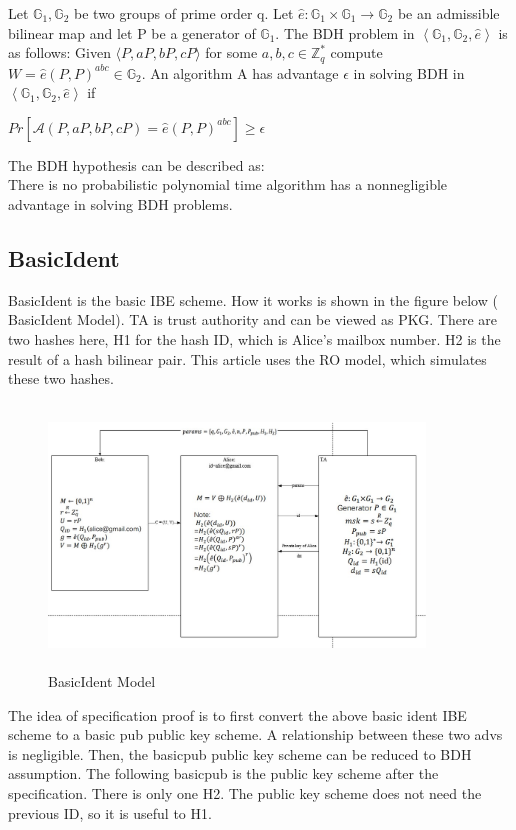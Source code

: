 \documentclass[runningheads,a4paper]{llncs}
\begin{document}
Let $\mathbb{G}_{1}, \mathbb{G}_{2}$ be two groups of prime order q. Let $\hat{e}: \mathbb{G}_{1} \times \mathbb{G}_{1} \rightarrow \mathbb{G}_{2}$ be an admissible bilinear map and let P be a generator of $\mathbb{G}_{1}$. The BDH problem in $\left\langle\mathbb{G}_{1}, \mathbb{G}_{2}, \hat{e}\right\rangle$ is as follows: Given $\langle P, a P, b P, c P\rangle$ for some $a, b, c \in \mathbb{Z}_{q}^{*}$ compute $W=\hat{e}(P, P)^{a b c} \in \mathbb{G}_{2}$. An algorithm A has advantage $\epsilon$ in solving BDH in $\left\langle\mathbb{G}_{1}, \mathbb{G}_{2}, \hat{e}\right\rangle$ if\\
             \centerline{${Pr}\left[\mathcal{A}(P, a P, b P, c P)=\hat{e}(P, P)^{a b c}\right] \geq \epsilon$}
The BDH hypothesis can be described as: \\
There is no probabilistic polynomial time algorithm has a nonnegligible advantage in solving BDH problems.
\subsection{BasicIdent}

BasicIdent is the basic IBE scheme. How it works is shown in the figure below ( BasicIdent Model). TA is trust authority and can be viewed as PKG. There are two hashes here, H1 for the hash ID, which is Alice's mailbox number. H2 is the result of a hash bilinear pair. This article uses the RO model, which simulates these two hashes.

\begin{figure}[H]
\centering
\includegraphics[width=10cm, height=7cm]{basicibe.JPG}
\caption{BasicIdent Model}
\end{figure}

The idea of specification proof is to first convert the above basic ident IBE scheme to a basic pub public key scheme. A relationship between these two advs is negligible. Then, the basicpub public key scheme can be reduced to BDH assumption. The following basicpub is the public key scheme after the specification. There is only one H2. The public key scheme does not need the previous ID, so it is useful to H1.
\end{document}
